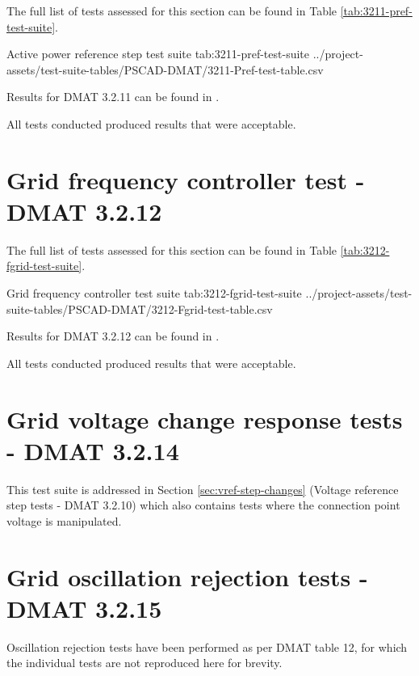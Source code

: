 \documentclass{../grid-link-report}
\newcommand{\projectassetsdir}{../project-assets}
\begin{document}
	
	
	
	
	The full list of tests assessed for this section can be found in Table \ref{tab:3211-pref-test-suite}.
	
	{
		\fontsize{6}{8}\selectfont
		\autoscaledlongtable
		{Active power reference step test suite}
		{tab:3211-pref-test-suite}
		{\projectassetsdir/test-suite-tables/PSCAD-DMAT/3211-Pref-test-table.csv}
	}
	
	Results for DMAT 3.2.11 can be found in .
	
	All tests conducted produced results that were acceptable.
	
	
	\section{Grid frequency controller test - DMAT 3.2.12}		
	
	
	
	
	The full list of tests assessed for this section can be found in Table \ref{tab:3212-fgrid-test-suite}.
	
	{
		\fontsize{7}{9}\selectfont
		\autoscaledlongtable
		{Grid frequency controller test suite}
		{tab:3212-fgrid-test-suite}
		{\projectassetsdir/test-suite-tables/PSCAD-DMAT/3212-Fgrid-test-table.csv}
	}
	
	Results for DMAT 3.2.12 can be found in .	
	
	All tests conducted produced results that were acceptable.
	
	
	\section{Grid voltage change response tests - DMAT 3.2.14}		
	
	
	This test suite is addressed in Section \ref{sec:vref-step-changes} (Voltage reference step tests - DMAT 3.2.10) which also contains tests where the connection point voltage is manipulated.
	
	\section{Grid oscillation rejection tests - DMAT 3.2.15}
	
	Oscillation rejection tests have been performed as per DMAT table 12, for which the individual tests are not reproduced here for brevity.
	
\end{document}
